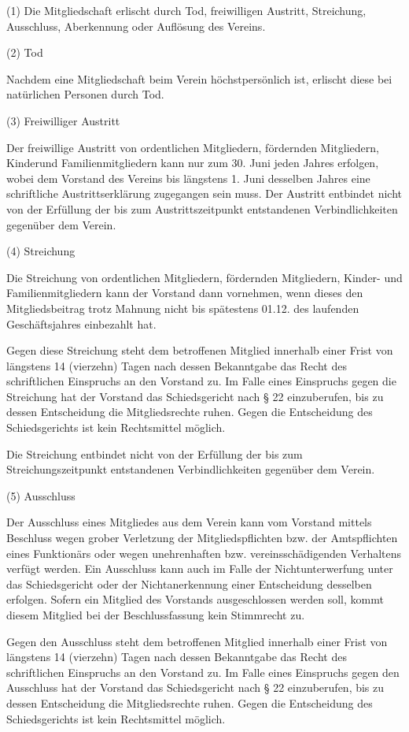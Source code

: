 \documentclass[11pt,a4paper]{article}
\begin{document}
(1)
Die Mitgliedschaft erlischt durch Tod, freiwilligen Austritt, Streichung, Ausschluss, Aberkennung oder Auflösung des Vereins.

(2)
Tod

Nachdem eine Mitgliedschaft beim Verein höchstpersönlich ist, erlischt diese bei natürlichen Personen durch Tod.

(3)
Freiwilliger Austritt

Der freiwillige Austritt von ordentlichen Mitgliedern, fördernden Mitgliedern, Kinderund Familienmitgliedern kann nur zum 30. Juni jeden Jahres erfolgen, wobei dem Vorstand des Vereins bis längstens 1. Juni desselben Jahres eine schriftliche Austrittserklärung zugegangen sein muss.
Der Austritt entbindet nicht von der Erfüllung der bis zum Austrittszeitpunkt entstandenen Verbindlichkeiten gegenüber dem Verein.

(4)
Streichung

Die Streichung von ordentlichen Mitgliedern, fördernden Mitgliedern, Kinder- und Familienmitgliedern kann der Vorstand dann vornehmen, wenn dieses den Mitgliedsbeitrag trotz Mahnung nicht bis spätestens 01.12. des laufenden Geschäftsjahres einbezahlt hat.

Gegen diese Streichung steht dem betroffenen Mitglied innerhalb einer Frist von längstens 14 (vierzehn) Tagen nach dessen Bekanntgabe das Recht des schriftlichen Einspruchs an den Vorstand zu.
Im Falle eines Einspruchs gegen die Streichung hat der Vorstand das Schiedsgericht nach § 22 einzuberufen, bis zu dessen Entscheidung die Mitgliedsrechte ruhen.
Gegen die Entscheidung des Schiedsgerichts ist kein Rechtsmittel möglich.

Die Streichung entbindet nicht von der Erfüllung der bis zum Streichungszeitpunkt entstandenen Verbindlichkeiten gegenüber dem Verein.

(5)
Ausschluss

Der Ausschluss eines Mitgliedes aus dem Verein kann vom Vorstand mittels Beschluss wegen grober Verletzung der Mitgliedspflichten bzw. der Amtspflichten eines Funktionärs oder wegen unehrenhaften bzw. vereinsschädigenden Verhaltens verfügt werden.
Ein Ausschluss kann auch im Falle der Nichtunterwerfung unter das Schiedsgericht oder der Nichtanerkennung einer Entscheidung desselben erfolgen.
Sofern ein Mitglied des Vorstands ausgeschlossen werden soll, kommt diesem Mitglied bei der Beschlussfassung kein Stimmrecht zu.

Gegen den Ausschluss steht dem betroffenen Mitglied innerhalb einer Frist von längstens 14 (vierzehn) Tagen nach dessen Bekanntgabe das Recht des schriftlichen Einspruchs an den Vorstand zu.
Im Falle eines Einspruchs gegen den Ausschluss hat der Vorstand das Schiedsgericht nach § 22 einzuberufen, bis zu dessen Entscheidung die Mitgliedsrechte ruhen.
Gegen die Entscheidung des Schiedsgerichts ist kein Rechtsmittel möglich.
\end{document}
